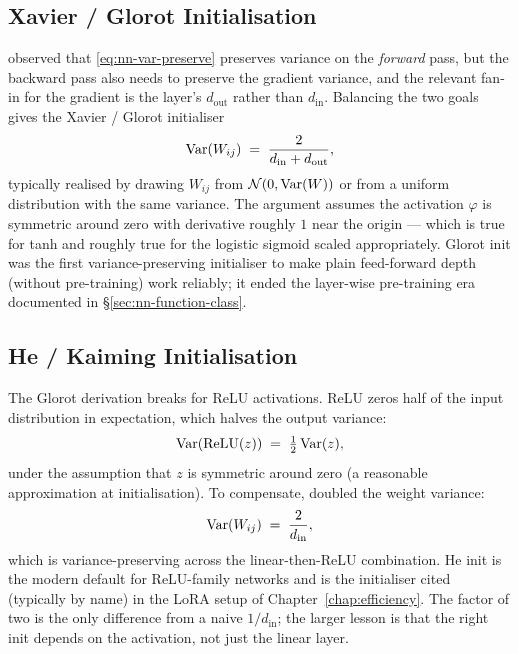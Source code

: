 \subsection{Xavier / Glorot Initialisation}

\citet{glorot2010understanding} observed that
\eqref{eq:nn-var-preserve} preserves variance on the
\emph{forward} pass, but the backward pass also needs to preserve
the gradient variance, and the relevant fan-in for the gradient
is the layer's $d_{\mathrm{out}}$ rather than $d_{\mathrm{in}}$.
Balancing the two goals gives the Xavier / Glorot initialiser
\begin{equation}
  \mathrm{Var}(W_{ij}) \;=\; \frac{2}{d_{\mathrm{in}} + d_{\mathrm{out}}},
  \label{eq:nn-xavier}
\end{equation}
typically realised by drawing $W_{ij}$ from $\mathcal{N}(0,
\mathrm{Var}(W))$ or from a uniform distribution with the same variance.
The argument assumes the activation $\varphi$ is symmetric around
zero with derivative roughly $1$ near the origin --- which is
true for tanh and roughly true for the logistic sigmoid scaled
appropriately. Glorot init was the first variance-preserving
initialiser to make plain feed-forward depth (without
pre-training) work reliably; it ended the layer-wise pre-training
era documented in §\ref{sec:nn-function-class}.

\subsection{He / Kaiming Initialisation}

The Glorot derivation breaks for ReLU activations. ReLU zeros
half of the input distribution in expectation, which halves the
output variance:
\[
  \mathrm{Var}(\mathrm{ReLU}(z)) \;=\; \tfrac{1}{2}\, \mathrm{Var}(z),
\]
under the assumption that $z$ is symmetric around zero (a
reasonable approximation at initialisation). To compensate,
\citet{he2015delving} doubled the weight variance:
\begin{equation}
  \mathrm{Var}(W_{ij}) \;=\; \frac{2}{d_{\mathrm{in}}},
  \label{eq:nn-he-init}
\end{equation}
which is variance-preserving across the linear-then-ReLU
combination. He init is the modern default for ReLU-family
networks and is the initialiser cited (typically by name) in the
LoRA setup of Chapter~\ref{chap:efficiency}. The factor of two is the only
difference from a naive $1/d_{\mathrm{in}}$; the larger lesson is
that the right init depends on the activation, not just the
linear layer.

